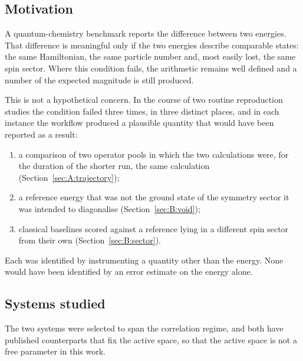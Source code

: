 \documentclass[11pt,a4paper]{article}
\begin{document}
\subsection{Motivation}

A quantum-chemistry benchmark reports the difference between two energies. That
difference is meaningful only if the two energies describe comparable states:
the same Hamiltonian, the same particle number and, most easily lost, the same
spin sector. Where this condition fails, the arithmetic remains well defined and
a number of the expected magnitude is still produced.

This is not a hypothetical concern. In the course of two routine reproduction
studies the condition failed three times, in three distinct places, and in each
instance the workflow produced a plausible quantity that would have been
reported as a result:

\begin{enumerate}[leftmargin=1.4em,itemsep=2pt]
\item a comparison of two operator pools in which the two calculations were, for
the duration of the shorter run, the same calculation
(Section~\ref{sec:A:trajectory});
\item a reference energy that was not the ground state of the symmetry sector
it was intended to diagonalise (Section~\ref{sec:B:void});
\item classical baselines scored against a reference lying in a different spin
sector from their own (Section~\ref{sec:B:sector}).
\end{enumerate}

Each was identified by instrumenting a quantity other than the energy. None
would have been identified by an error estimate on the energy alone.

\subsection{Systems studied}

The two systems were selected to span the correlation regime, and both have
published counterparts that fix the active space, so that the active space is
not a free parameter in this work.
\end{document}
